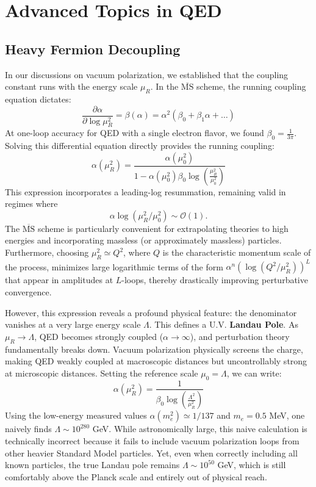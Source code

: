 \section{Advanced Topics in QED}

\subsection{Heavy Fermion Decoupling}

In our discussions on vacuum polarization, we established that the coupling constant runs with the energy scale $\mu_R$. In the $\overline{\text{MS}}$ scheme, the running coupling equation dictates:
\[
    \frac{\partial \alpha}{\partial \log \mu_R^2} = \beta(\alpha) = \alpha^2 (\beta_0 + \beta_1 \alpha + \dots)
\]
At one-loop accuracy for QED with a single electron flavor, we found $\beta_0 = \frac{1}{3\pi}$. Solving this differential equation directly provides the running coupling:
\[
    \alpha(\mu_R^2) = \frac{\alpha(\mu_0^2)}{1 - \alpha(\mu_0^2) \beta_0 \log\left(\frac{\mu_R^2}{\mu_0^2}\right)}
\]
This expression incorporates a leading-log resummation, remaining valid in regimes where
\[
    \alpha \log(\mu_R^2/\mu_0^2) \sim \mathcal{O}(1).
\]
The $\overline{\text{MS}}$ scheme is particularly convenient for extrapolating theories to high energies and incorporating massless (or approximately massless) particles. Furthermore, choosing $\mu_R^2 \simeq Q^2$, where $Q$ is the characteristic momentum scale of the process, minimizes large logarithmic terms of the form $\alpha^n (\log(Q^2/\mu_R^2))^L$ that appear in amplitudes at $L$-loops, thereby drastically improving perturbative convergence.

However, this expression reveals a profound physical feature: the denominator vanishes at a very large energy scale $\Lambda$. This defines a U.V. \textbf{Landau Pole}. As $\mu_R \to \Lambda$, QED becomes strongly coupled ($\alpha \to \infty$), and perturbation theory fundamentally breaks down. Vacuum polarization physically screens the charge, making QED weakly coupled at macroscopic distances but uncontrollably strong at microscopic distances. Setting the reference scale $\mu_0 = \Lambda$, we can write:
\[
    \alpha(\mu_R^2) = \frac{1}{\beta_0 \log\left(\frac{\Lambda^2}{\mu_R^2}\right)}
\]
Using the low-energy measured values $\alpha(m_e^2) \simeq 1/137$ and $m_e = 0.5$ MeV, one naively finds $\Lambda \sim 10^{280}$ GeV. While astronomically large, this naive calculation is technically incorrect because it fails to include vacuum polarization loops from other heavier Standard Model particles. Yet, even when correctly including all known particles, the true Landau pole remains $\Lambda \sim 10^{50}$ GeV, which is still comfortably above the Planck scale and entirely out of physical reach.

